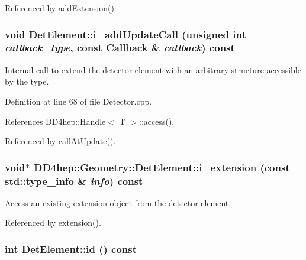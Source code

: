 Referenced by addExtension().\hypertarget{class_d_d4hep_1_1_geometry_1_1_det_element_adc63245333efeee5af537619b0cb8dec}{
\subsubsection[{i\_\-addUpdateCall}]{\setlength{\rightskip}{0pt plus 5cm}void DetElement::i\_\-addUpdateCall (unsigned int {\em callback\_\-type}, \/  const {\bf Callback} \& {\em callback}) const}}
\label{class_d_d4hep_1_1_geometry_1_1_det_element_adc63245333efeee5af537619b0cb8dec}


Internal call to extend the detector element with an arbitrary structure accessible by the type. 

Definition at line 68 of file Detector.cpp.

References DD4hep::Handle$<$ T $>$::access().

Referenced by callAtUpdate().\hypertarget{class_d_d4hep_1_1_geometry_1_1_det_element_a45f86dc46aa21a9466c2b1270029bfd2}{
\subsubsection[{i\_\-extension}]{\setlength{\rightskip}{0pt plus 5cm}void$\ast$ DD4hep::Geometry::DetElement::i\_\-extension (const std::type\_\-info \& {\em info}) const}}
\label{class_d_d4hep_1_1_geometry_1_1_det_element_a45f86dc46aa21a9466c2b1270029bfd2}


Access an existing extension object from the detector element. 

Referenced by extension().\hypertarget{class_d_d4hep_1_1_geometry_1_1_det_element_ab792b1e02d95042fd94897283df9f8fa}{
\subsubsection[{id}]{\setlength{\rightskip}{0pt plus 5cm}int DetElement::id () const}}
\label{class_d_d4hep_1_1_geometry_1_1_det_element_ab792b1e02d95042fd94897283df9f8fa}


